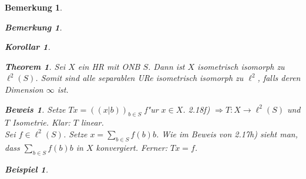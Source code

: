 \documentclass[a4paper,11pt]{book}
\newcommand{\R}{{\mathbb R}}
\newtheorem{Kor}[Def]{Korollar}
\newtheorem{Theo}[Def]{Theorem}
\newtheorem*{BspNO}{Beispiel}
\newtheorem*{BemNO}{Bemerkung}
\newtheorem{Bem}[Def]{Bemerkung}
\theoremstyle{nonumberplain}
\newtheorem{Bew}{Beweis}
\begin{document}
\begin{Bem}
\begin{BemNO}
\begin{Kor}
\begin{Theo}
Sei $X$ ein HR mit ONB $S$. Dann ist $X$ isometrisch isomorph zu $\ell^2(S)$. Somit sind alle separablen URe isometrisch isomorph zu $\ell^2$, falls deren Dimension $\infty$ ist.
\end{Theo}


\begin{Bew}
Setze $Tx = \left( (x|b) \right)_{b \in S}$ f"ur $x \in X$. 2.18f) $\Rightarrow T: X \rightarrow \ell^2(S)$ und $T$ Isometrie. Klar: $T$ linear.\\
Sei $f \in \ell^2(S)$. Setze $x = \sum_{b \in S} f(b)b$. Wie im Beweis von 2.17h) sieht man, dass $\sum_{b \in S} f(b)b$ in $X$ konvergiert. Ferner: $Tx = f$.
\end{Bew}


\begin{BspNO}
\begin{enumerate}
\item $L^2(\R^d) \cong \ell^d$

\item $L^2([0,1]) \cong \ell^2$

\item "Ub 22: AP_2(\R) \cong \ell^2(\R)$
\end{enumerate
\end{BspNO}




\end{enumerate}
\end{BspNO}
\end{Kor}
\end{BemNO}
\end{Bem}
\end{document}
